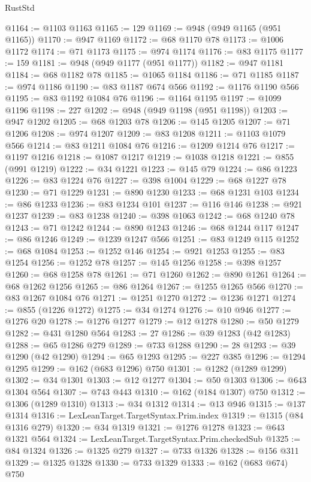 \begin{lexlean}{RustStd}
\begin{coremodule}
{\begin{coremodule}
{{{{{{{{{{{{{{{{{{{{{{{{{{{{{{{{{{{@1164 := @1103 @1163
@1165 := 129
@1169 := @948 (@949 @1165 (@951 @1165))
@1170 := @947 @1169
@1172 := @68 @1170 @78
@1173 := @1006 @1172
@1174 := @71 @1173
@1175 := @974 @1174
@1176 := @83 @1175
@1177 := 159
@1181 := @948 (@949 @1177 (@951 @1177))
@1182 := @947 @1181
@1184 := @68 @1182 @78
@1185 := @1065 @1184
@1186 := @71 @1185
@1187 := @974 @1186
@1190 := @83 @1187 @674 @566
@1192 := @1176 @1190 @566
@1195 := @83 @1192 @1084 @76
@1196 := @1164 @1195
@1197 := @1099 @1196
@1198 := 227
@1202 := @948 (@949 @1198 (@951 @1198))
@1203 := @947 @1202
@1205 := @68 @1203 @78
@1206 := @145 @1205
@1207 := @71 @1206
@1208 := @974 @1207
@1209 := @83 @1208
@1211 := @1103 @1079 @566
@1214 := @83 @1211 @1084 @76
@1216 := @1209 @1214 @76
@1217 := @1197 @1216
@1218 := @1087 @1217
@1219 := @1038 @1218
@1221 := @855 (@991 @1219)
@1222 := @34 @1221
@1223 := @145 @79
@1224 := @86 @1223
@1226 := @83 @1224 @76
@1227 := @398 @1004
@1229 := @68 @1227 @78
@1230 := @71 @1229
@1231 := @890 @1230
@1233 := @68 @1231 @103
@1234 := @86 @1233
@1236 := @83 @1234 @101
@1237 := @116 @146
@1238 := @921 @1237
@1239 := @83 @1238
@1240 := @398 @1063
@1242 := @68 @1240 @78
@1243 := @71 @1242
@1244 := @890 @1243
@1246 := @68 @1244 @117
@1247 := @86 @1246
@1249 := @1239 @1247 @566
@1251 := @83 @1249 @115
@1252 := @68 @1084
@1253 := @1252 @146
@1254 := @921 @1253
@1255 := @83 @1254
@1256 := @1252 @78
@1257 := @145 @1256
@1258 := @398 @1257
@1260 := @68 @1258 @78
@1261 := @71 @1260
@1262 := @890 @1261
@1264 := @68 @1262 @1256
@1265 := @86 @1264
@1267 := @1255 @1265 @566
@1270 := @83 @1267 @1084 @76
@1271 := @1251 @1270
@1272 := @1236 @1271
@1274 := @855 (@1226 @1272)
@1275 := @34 @1274
@1276 := @10 @946
@1277 := @1276 @20
@1278 := @1276 @1277
@1279 := @12 @1278
@1280 := @50 @1279
@1282 := @431 @1280 @564
@1283 := 27
@1286 := @39 @1283 (@42 @1283)
@1288 := @65 @1286 @279
@1289 := @733 @1288
@1290 := 28
@1293 := @39 @1290 (@42 @1290)
@1294 := @65 @1293
@1295 := @227 @385
@1296 := @1294 @1295
@1299 := @162 (@683 @1296) @750
@1301 := @1282 (@1289 @1299)
@1302 := @34 @1301
@1303 := @12 @1277
@1304 := @50 @1303
@1306 := @643 @1304 @564
@1307 := @743 @443
@1310 := @162 (@184 @1307) @750
@1312 := @1306 (@1289 @1310)
@1313 := @34 @1312
@1314 := @13 @946
@1315 := @137 @1314
@1316 := LexLeanTarget.TargetSyntax.Prim.index
@1319 := @1315 (@84 @1316 @279)
@1320 := @34 @1319
@1321 := @1276 @1278
@1323 := @643 @1321 @564
@1324 := LexLeanTarget.TargetSyntax.Prim.checkedSub
@1325 := @84 @1324
@1326 := @1325 @279
@1327 := @733 @1326
@1328 := @156 @311
@1329 := @1325 @1328
@1330 := @733 @1329
@1333 := @162 (@683 @674) @750
}}}}}}}}}}}}}}}}}}}}}}}}}}}}}}}}}}}
\end{coremodule}}
\end{coremodule}
\end{lexlean}
